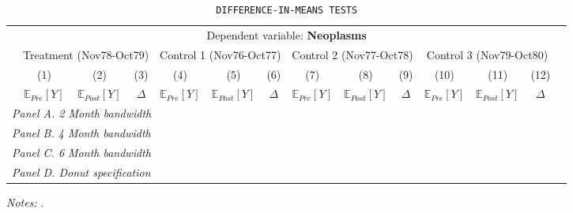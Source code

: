  \begin{table}[H] \begin{threeparttable} \centering \caption{\texttt{DIFFERENCE-IN-MEANS TESTS}} {\def\sym#1{\ifmmode^{#1}\else\(^{#1}\)\fi} \begin{tabular}{l*{13}{c}} \toprule & \multicolumn{12}{c}{Dependent variable: \textbf{Neoplasms}} \\ \cmidrule(lr){2-13}
            &\multicolumn{3}{c}{Treatment (Nov78-Oct79)}&\multicolumn{3}{c}{Control 1 (Nov76-Oct77)}&\multicolumn{3}{c}{Control 2 (Nov77-Oct78)}&\multicolumn{3}{c}{Control 3 (Nov79-Oct80)}\\\cmidrule(lr){2-4}\cmidrule(lr){5-7}\cmidrule(lr){8-10}\cmidrule(lr){11-13}
            &\multicolumn{1}{c}{(1)}&\multicolumn{1}{c}{(2)}&\multicolumn{1}{c}{(3)}&\multicolumn{1}{c}{(4)}&\multicolumn{1}{c}{(5)}&\multicolumn{1}{c}{(6)}&\multicolumn{1}{c}{(7)}&\multicolumn{1}{c}{(8)}&\multicolumn{1}{c}{(9)}&\multicolumn{1}{c}{(10)}&\multicolumn{1}{c}{(11)}&\multicolumn{1}{c}{(12)}\\
            &\multicolumn{1}{c}{$\mathbb{E}_{Pre}[Y]$}&\multicolumn{1}{c}{$\mathbb{E}_{Post}[Y]$}&\multicolumn{1}{c}{$\Delta$}&\multicolumn{1}{c}{$\mathbb{E}_{Pre}[Y]$}&\multicolumn{1}{c}{$\mathbb{E}_{Post}[Y]$}&\multicolumn{1}{c}{$\Delta$}&\multicolumn{1}{c}{$\mathbb{E}_{Pre}[Y]$}&\multicolumn{1}{c}{$\mathbb{E}_{Post}[Y]$}&\multicolumn{1}{c}{$\Delta$}&\multicolumn{1}{c}{$\mathbb{E}_{Pre}[Y]$}&\multicolumn{1}{c}{$\mathbb{E}_{Post}[Y]$}&\multicolumn{1}{c}{$\Delta$}\\
\midrule
 \multicolumn{13}{l}{\emph{Panel A. 2 Month bandwidth}} \\    \midrule\multicolumn{13}{l}{\emph{Panel B. 4 Month bandwidth}} \\    \midrule\multicolumn{13}{l}{\emph{Panel C. 6 Month bandwidth}} \\    \midrule\multicolumn{13}{l}{\emph{Panel D. Donut specification}} \\    
\bottomrule \end{tabular} } \begin{tablenotes} \item \scriptsize \emph{Notes:} . \end{tablenotes} \end{threeparttable} \end{table} 
